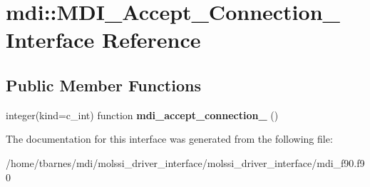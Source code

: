 \hypertarget{interfacemdi_1_1MDI__Accept__Connection__}{\section{mdi\-:\-:M\-D\-I\-\_\-\-Accept\-\_\-\-Connection\-\_\- Interface Reference}
\label{interfacemdi_1_1MDI__Accept__Connection__}
}
\subsection*{Public Member Functions}
\begin{DoxyCompactItemize}
\item 
\hypertarget{interfacemdi_1_1MDI__Accept__Connection___a3e153bbbb4391ee3c0b3be4fa5b5ceeb}{integer(kind=c\-\_\-int) function {\bfseries mdi\-\_\-accept\-\_\-connection\-\_\-} ()}\label{interfacemdi_1_1MDI__Accept__Connection___a3e153bbbb4391ee3c0b3be4fa5b5ceeb}

\end{DoxyCompactItemize}


The documentation for this interface was generated from the following file\-:\begin{DoxyCompactItemize}
\item 
/home/tbarnes/mdi/molssi\-\_\-driver\-\_\-interface/molssi\-\_\-driver\-\_\-interface/mdi\-\_\-f90.\-f90\end{DoxyCompactItemize}
